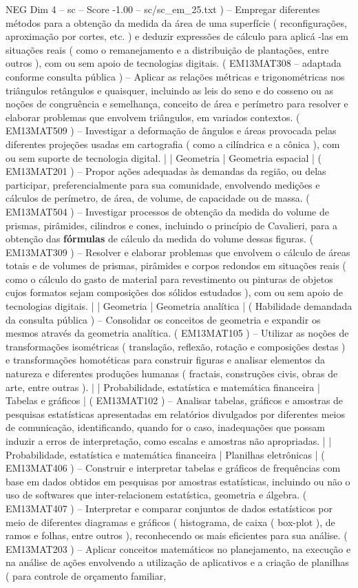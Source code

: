 \begin{textsample}{NEG Dim 4 – sc – Score -1.00 – sc/sc\_em\_25.txt}
) – Empregar diferentes métodos para a obtenção da medida da área de uma superfície ( reconfigurações, aproximação por cortes, etc. ) e deduzir expressões de cálculo para aplicá -las em situações reais ( como o remanejamento e a distribuição de plantações, entre outros ), com ou sem apoio de tecnologias digitais. ( EM13MAT308 – adaptada conforme consulta pública ) – Aplicar as relações métricas e trigonométricas nos triângulos retângulos e quaisquer, incluindo as leis do seno e do cosseno ou as noções de congruência e semelhança, conceito de área e perímetro para resolver e elaborar problemas que envolvem triângulos, em variados contextos. ( EM13MAT509 ) – Investigar a deformação de ângulos e áreas provocada pelas diferentes projeções usadas em cartografia ( como a cilíndrica e a cônica ), com ou sem suporte de tecnologia digital. | | Geometria | Geometria espacial | ( EM13MAT201 ) – Propor ações adequadas às demandas da região, ou delas participar, preferencialmente para sua comunidade, envolvendo medições e cálculos de perímetro, de área, de volume, de capacidade ou de massa. ( EM13MAT504 ) – Investigar processos de obtenção da medida do volume de prismas, pirâmides, cilindros e cones, incluindo o princípio de Cavalieri, para a obtenção das \textbf{fórmulas} de cálculo da medida do volume dessas figuras. ( EM13MAT309 ) – Resolver e elaborar problemas que envolvem o cálculo de áreas totais e de volumes de prismas, pirâmides e corpos redondos em situações reais ( como o cálculo do gasto de material para revestimento ou pinturas de objetos cujos formatos sejam composições dos sólidos estudados ), com ou sem apoio de tecnologias digitais. | | Geometria | Geometria analítica | ( Habilidade demandada da consulta pública ) – Consolidar os conceitos de geometria e expandir os mesmos através da geometria analítica. ( EM13MAT105 ) – Utilizar as noções de transformações isométricas ( translação, reflexão, rotação e composições destas ) e transformações homotéticas para construir figuras e analisar elementos da natureza e diferentes produções humanas ( fractais, construções civis, obras de arte, entre outras ). | | Probabilidade, estatística e matemática financeira | Tabelas e gráficos | ( EM13MAT102 ) – Analisar tabelas, gráficos e amostras de pesquisas estatísticas apresentadas em relatórios divulgados por diferentes meios de comunicação, identificando, quando for o caso, inadequações que possam induzir a erros de interpretação, como escalas e amostras não apropriadas. | | Probabilidade, estatística e matemática financeira | Planilhas eletrônicas | ( EM13MAT406 ) – Construir e interpretar tabelas e gráficos de frequências com base em dados obtidos em pesquisas por amostras estatísticas, incluindo ou não o uso de softwares que inter-relacionem estatística, geometria e álgebra. ( EM13MAT407 ) – Interpretar e comparar conjuntos de dados estatísticos por meio de diferentes diagramas e gráficos ( histograma, de caixa ( box-plot ), de ramos e folhas, entre outros ), reconhecendo os mais eficientes para sua análise. ( EM13MAT203 ) – Aplicar conceitos matemáticos no planejamento, na execução e na análise de ações envolvendo a utilização de aplicativos e a criação de planilhas ( para controle de orçamento familiar, 
\end{textsample}
